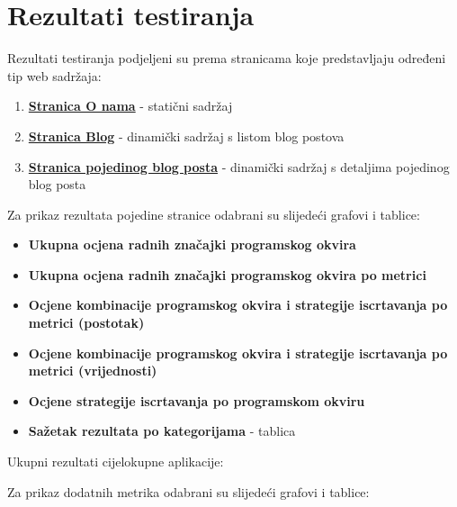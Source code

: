 \section{Rezultati testiranja}
Rezultati testiranja podjeljeni su prema stranicama koje predstavljaju određeni tip web sadržaja:

\begin{enumerate}
    \item \hyperref[sec:rezultati-o-nama]{\textbf{Stranica O nama}} - statični sadržaj
    \item \hyperref[sec:rezultati-blog]{\textbf{Stranica Blog}} - dinamički sadržaj s listom blog postova
    \item \hyperref[sec:rezultati-blog-post]{\textbf{Stranica pojedinog blog posta}} - dinamički sadržaj s detaljima pojedinog blog posta
\end{enumerate}

\bigskip
\noindent
Za prikaz rezultata pojedine stranice odabrani su slijedeći grafovi i tablice:

\begin{itemize}
    \item \textbf{Ukupna ocjena radnih značajki programskog okvira}
    \item \textbf{Ukupna ocjena radnih značajki programskog okvira po metrici}
    \item \textbf{Ocjene kombinacije programskog okvira i strategije iscrtavanja po metrici (postotak)}
    \item \textbf{Ocjene kombinacije programskog okvira i strategije iscrtavanja po metrici (vrijednosti)}
    \item \textbf{Ocjene strategije iscrtavanja po programskom okviru}
    \item \textbf{Sažetak rezultata po kategorijama} - tablica
\end{itemize}

Ukupni rezultati cijelokupne aplikacije:


\bigskip
\noindent
Za prikaz dodatnih metrika odabrani su slijedeći grafovi i tablice:

